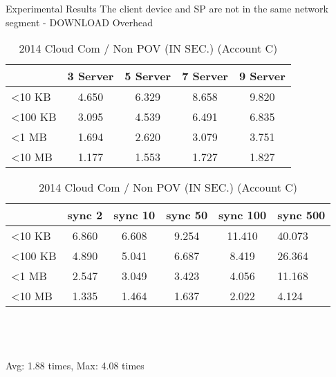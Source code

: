 \begin{frame}{Experimental Results}
{The client device and SP are \alert{not} in the same network segment - DOWNLOAD Overhead}
	\scriptsize
    \begin{table}[]
    \centering
    \caption{My Method / Non POV (IN SEC.) (Account C)}
    \begin{tabular}{lcccc}
                         & 3 Server & 5 Server & 7 Server & 9 Server \\ \hline
        \textless 10 KB  & 4.650 & 6.329 & 8.658 & 9.820 \\ \hline
        \textless 100 KB & 3.095 & 4.539 & 6.491 & 6.835 \\ \hline
        \textless 1 MB   & 1.694 & 2.620 & 3.079 & 3.751 \\ \hline
        \textless 10 MB  & 1.177 & 1.553 & 1.727 & 1.827 \\ \hline
    \end{tabular}
    \caption{2014 Cloud Com / Non POV (IN SEC.) (Account C)}
    \begin{tabular}{lccccl}
                         & sync 2   & sync 10  & sync 50  & sync 100 & sync 500 \\ \hline
        \textless 10 KB  & 6.860 & 6.608 & 9.254 & 11.410  & 40.073  \\ \hline
        \textless 100 KB & 4.890 & 5.041 & 6.687 & 8.419   & 26.364  \\ \hline
        \textless 1 MB   & 2.547 & 3.049 & 3.423 & 4.056   & 11.168  \\ \hline
        \textless 10 MB  & 1.335 & 1.464 & 1.637 & 2.022   & 4.124   \\ \hline
    \end{tabular}
    ~\\
    ~\\
    ~\\
    \alert{Avg: 1.88 times, Max: 4.08 times}
    \end{table}
\end{frame}